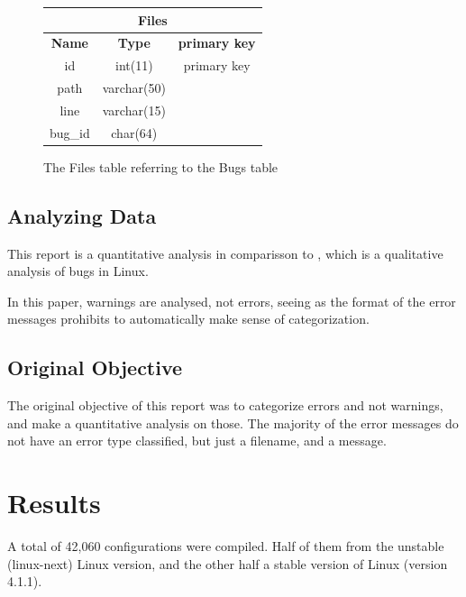 \documentclass[a4paper,11pt]{report}
\newcommand{\figa}{
    \begin{figure}[!htpb]
    \centering
}
\newcommand{\figb}[2]{
    \caption{#1}
    \label{#2}
    \end{figure}
}
\begin{document}
\figa
    \begin{tabular}{c|c|c}
        \hline
        \hline
        \multicolumn{3}{c}{\textbf{Files}} \\
        \hline
        \textbf{Name} & \textbf{Type} &\textbf{primary key} \\
        \hline
        id & int(11) & primary key \\
        path & varchar(50) \\
        line & varchar(15) \\
        bug\_id & char(64) \\
        \hline
        \hline
    \end{tabular}
\figb{The Files table referring to the Bugs table}{fig:filestable}



\section{Analyzing Data}
This report is a quantitative analysis in comparisson to 
    \cite{42bugs}
, which is a qualitative analysis of bugs in Linux.

In this paper, warnings are analysed, not errors, seeing as the format of the 
error messages prohibits to automatically make sense of categorization.



\section{Original Objective}
The original objective of this report was to categorize errors and not 
warnings, and make a quantitative analysis on those. The majority of the error
messages do not have an error type classified, but just a filename, and a 
message.
\\






\newpage
\chapter{Results}

A total of 42,060 configurations were compiled. Half of them from the unstable 
(linux-next) Linux version, and the other half a stable version of Linux 
(version 4.1.1).
\end{document}
